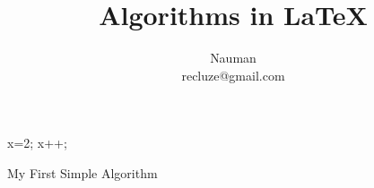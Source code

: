 \documentclass{article}
\begin{document}
\title{Algorithms in \LaTeX}
\author{Nauman \\ recluze@gmail.com}
\maketitle



\begin{algorithm}
\begin{algorithmic}

\STATE x=2;
   \STATE x++;
\ELSE
   \RETURN 
\ENDIF
\end{algorithmic}
\caption{My First Simple Algorithm}
\label{algo:first}
\end{algorithm}

\end{document}
